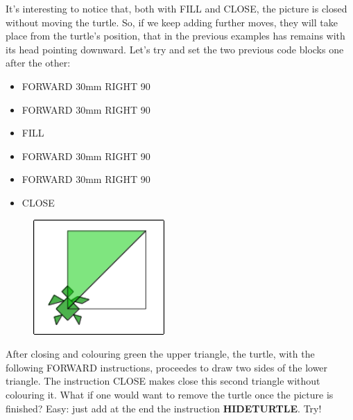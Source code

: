 \vskip 1cm

It's interesting to notice that, both with FILL and CLOSE, the picture is closed without moving the turtle. So, if we keep adding further moves, they will take place from the turtle's position, that in the previous examples has remains with its head pointing downward.
Let's try and set the two previous code blocks one after the other:

\vskip 1cm

\begin{scriptsize}
\begin{minipage}{0.40\textwidth}
\begin{itemize}[itemsep=-3pt,parsep=2pt]
\item[] FORWARD 30mm RIGHT 90
\item[] FORWARD 30mm RIGHT 90
\item[] FILL                  
\item[] FORWARD 30mm RIGHT 90
\item[] FORWARD 30mm RIGHT 90
\item[] CLOSE                  
\end{itemize}
\end{minipage}
\end{scriptsize}
\begin{minipage}{0.4\textwidth}
\begin{figure}[H]
   \includegraphics[width=5.0cm,trim=4 4 8 4,clip]{./images/disegnare/disegnare-15.png}
   \label{dis-15}
\end{figure}
\end{minipage} \hfill

\vskip 1cm

After closing and colouring green the upper triangle, the turtle, with the following FORWARD instructions, proceedes to draw two sides of the lower triangle. The instruction CLOSE makes close this second triangle without colouring it.
What if one would want to remove the turtle once the picture is finished? Easy: just add at the end the instruction
 \textbf{HIDETURTLE}. Try! 

